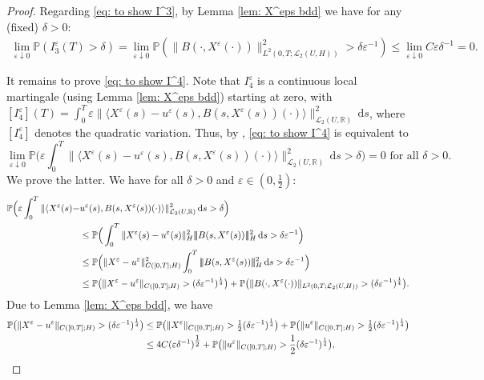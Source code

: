 \documentclass{amsart}
\newcommand{\dd}{\,\mathrm{d}}
\newcommand{\UH}{\mathcal{L}_2(U,H)}
\newcommand{\<}{\langle}
\newcommand{\?}{\rangle}
\newcommand{\nn}{|\!|\!|}
\theoremstyle{plain}
\theoremstyle{remark}
\theoremstyle{plain}
\numberwithin{equation}{section}
\def\R{{\mathbb R}}
\renewcommand{\P}{\mathbb{P}}
\newcommand{\eps}{\varepsilon}
\begin{document}
\begin{proof}
    Regarding \eqref{eq: to show I^3}, by Lemma \ref{lem: X^eps bdd} we have for any (fixed) $\delta>0$:
    \begin{align*}
    \lim_{\eps\downarrow 0}\P({I}_3^\eps(T)>\delta)
    =\lim_{\eps\downarrow 0}\P( \| B(\cdot,X^\eps(\cdot))\|_{L^2(0,T;\UH)}^2>{\delta}{\eps}^{-1})
    \leq \lim_{\eps\downarrow 0}{C\eps}{\delta}^{-1}=0.
    \end{align*}

     It remains to prove \eqref{eq: to show I^4}.
    Note that ${I}_4^\eps$ is a continuous local martingale (using Lemma \ref{lem: X^eps bdd}) starting at zero, with $[{I}_4^\eps](T)=\int_0^T\eps\|\<X^\eps(s)-u^{\eps}(s),B(s,X^\eps(s))(\cdot)\?\|_{\mathcal{L}_2(U,\R)}^2\dd s$, where $[I_4^\eps]$ denotes the  quadratic variation.
    Thus, by  \cite[Prop. 18.6]{kallenberg21}, \eqref{eq: to show I^4} is equivalent to
    \begin{equation}\label{eq: I^4 sufficient convergence}
    \lim_{\eps\downarrow0}\P\Big(\eps\int_0^T\|\<X^\eps(s)-u^{\eps}(s),B(s,X^\eps(s))(\cdot)\?\|_{\mathcal{L}_2(U,\R)}^2\dd s>\delta\Big)=0 \text{ for all } \delta>0.
    \end{equation}
    We prove the latter. We have for all $\delta>0$ and $\eps\in(0,\frac{1}{2})$:
    \begin{align}
    \P\Big(\eps\int_0^T\|\<X^\eps(s)-&u^{\eps}(s),B(s,X^\eps(s))(\cdot)\?\|_{\mathcal{L}_2(U,\R)}^2\dd s>\delta\Big)\notag\\
    &\leq\P\Big(\int_0^T \|X^\eps(s)-u^{\eps}(s)\|_H^2\nn B(s,X^\eps(s))\nn_H^2\dd s>{\delta}{\eps}^{-1}\Big)\notag\\
    &\leq \P\Big(\|X^\eps-u^{\eps}\|_{C([0,T];H)}^2 \int_0^T \nn B(s,X^\eps(s))\nn_H^2\dd s>{\delta}{\eps}^{-1}\Big)\notag\\
    &\leq \P\big(\|X^\eps-u^{\eps}\|_{C([0,T];H)}>({\delta}{\eps}^{-1})^{\frac{1}{4}}\big)+ \P\big(\| B(\cdot,X^\eps(\cdot))\|_{L^2(0,T;\UH)} >({\delta}{\eps}^{-1})^{\frac{1}{4}}\big).\label{eq: weak L1 estimates}
    \end{align}
    Due to Lemma \ref{lem: X^eps bdd}, we have
    \begin{align}
     \P\big(\|X^\eps-u^{\eps}\|_{C([0,T];H)}>({\delta}{\eps}^{-1})^{\frac{1}{4}}\big)
      & \leq \P\big(\|X^\eps\|_{C([0,T];H)}>\tfrac{1}{2}({\delta}{\eps}^{-1})^{\frac{1}{4}}\big)+\P\big(\|u^{\eps}\|_{C([0,T];H)}>\tfrac{1}{2}({\delta}{\eps}^{-1})^{\frac{1}{4}}\big)\notag\\
     & \leq 4C({\eps}{\delta}^{-1})^{\tfrac{1}{2}}+\P\big(\|u^{\eps}\|_{C([0,T];H)}>\frac{1}{2}({\delta}{\eps}^{-1})^{\frac{1}{4}}\big),

\end{align}
\end{proof}
\end{document}
